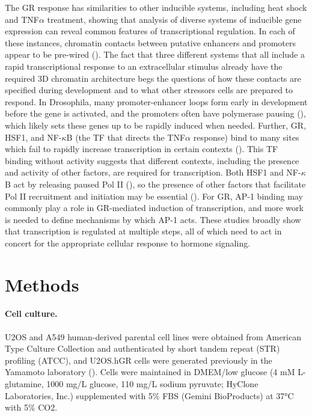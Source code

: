 \documentclass{article}
\begin{document}
{The GR response has similarities to other inducible systems, including heat shock and TNF$\alpha$ treatment, showing that analysis of diverse systems of inducible gene expression can reveal common features of transcriptional regulation. In each of these instances, chromatin contacts between putative enhancers and promoters appear to be pre-wired (\cite{jin_high-resolution_2013, dippolito_pre-established_2018, ray_chromatin_2019}). The fact that three different systems that all include a rapid transcriptional response to an extracellular stimulus already have the required 3D chromatin architecture begs the questions of how these contacts are specified during development and to what other stressors cells are prepared to respond. In Drosophila, many promoter-enhancer loops form early in development before the gene is activated, and the promoters often have polymerase pausing (\cite{ghavi-helm_enhancer_2014}), which likely sets these genes up to be rapidly induced when needed. Further, GR, HSF1, and NF-$\kappa$B (the TF that directs the TNF$\alpha$ response) bind to many sites which fail to rapidly increase transcription in certain contexts (\cite{jin_high-resolution_2013, mahat_mammalian_2016, vockley_direct_2016, vihervaara_transcriptional_2017}). This TF binding without activity suggests that different contexts, including the presence and activity of other factors, are required for transcription. Both HSF1 and NF-$\kappa$B act by releasing paused Pol II (\cite{barboric_nf-b_2001, danko_signaling_2013, duarte_transcription_2016}), so the presence of other factors that facilitate Pol II recruitment and initiation may be essential (\cite{duarte_transcription_2016}). For GR, AP-1 binding may commonly play a role in GR-mediated induction of transcription, and more work is needed to define mechanisms by which AP-1 acts. These studies broadly show that transcription is regulated at multiple steps, all of which need to act in concert for the appropriate cellular response to hormone signaling.

\section*{Methods}
\paragraph{Cell culture.} U2OS and A549 human-derived parental cell lines were obtained from American Type Culture Collection and authenticated by short tandem repeat (STR) profiling (ATCC), and U2OS.hGR cells were generated previously in the Yamamoto laboratory (\cite{rogatsky_glucocorticoid_1997}). Cells were maintained in DMEM/low glucose (4 mM L-glutamine, 1000 mg/L glucose, 110 mg/L sodium pyruvate; HyClone Laboratories, Inc.) supplemented with 5\% FBS (Gemini BioProducts) at 37°C with 5\% CO2. 
}
\end{document}
